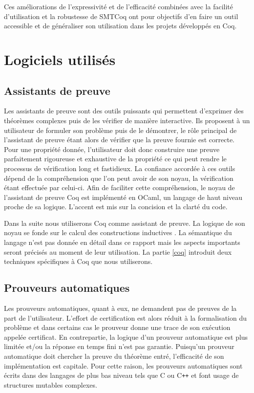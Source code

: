 \documentclass[11pt]{article}
\begin{document}
Ces améliorations de l'expressivité et de l'efficacité combinées avec la facilité d'utilisation et la robustesse de SMTCoq ont pour objectifs d'en faire un outil accessible et de généraliser son utilisation dans les projets développés en Coq.



\newpage
\section{Logiciels utilisés}

\subsection{Assistants de preuve}\label{assistants}

Les assistants de preuve sont des outils puissants qui permettent d'exprimer des théorèmes complexes puis de les vérifier de manière interactive. Ils proposent à un utilisateur de formuler son problème puis de le démontrer, le rôle principal de l'assistant de preuve étant alors de vérifier que la preuve fournie est correcte. Pour une propriété donnée, l'utilisateur doit donc construire une preuve parfaitement rigoureuse et exhaustive de la propriété ce qui peut rendre le processus de vérification long et fastidieux. La confiance accordée à ces outils dépend de la compréhension que l'on peut avoir de son noyau, la vérification étant effectuée par celui-ci. Afin de faciliter cette compréhension, le noyau de l'assistant de preuve Coq est implémenté en OCaml, un langage de haut niveau proche de sa logique. L'accent est mis sur la concision et la clarté du code. \medbreak

Dans la suite nous utiliserons Coq comme assistant de preuve. La logique de son noyau se fonde sur le calcul des constructions inductives \cite{coq_intro}. La sémantique du langage n'est pas donnée en détail dans ce rapport mais les aspects importants seront précisés au moment de leur utilisation. La partie \ref{coq} introduit deux techniques spécifiques à Coq que nous utiliserons. 

\subsection{Prouveurs automatiques}\label{prouveurs}

Les prouveurs automatiques, quant à eux, ne demandent pas de preuves de la part de l'utilisateur. L'effort de certification est alors réduit à la formalisation du problème et dans certains cas le prouveur donne une trace de son exécution appelée certificat. En contrepartie, la logique d'un prouveur automatique est plus limitée et/ou la réponse en temps fini n'est pas garantie. Puisqu'un prouveur automatique doit chercher la preuve du théorème entré, l'efficacité de son implémentation est capitale. Pour cette raison, les prouveurs automatiques sont écrits dans des langages de plus bas niveau tels que C ou C\texttt{++} et font usage de structures mutables complexes. \medbreak
\end{document}
